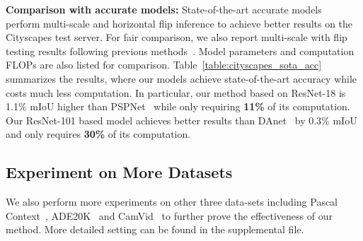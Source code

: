 \noindent
\textbf{Comparison with accurate models: } 
State-of-the-art accurate models~\cite{DAnet,pspnet,denseaspp,nvidia_seg_video} perform multi-scale and horizontal flip inference to achieve better results on the Cityscapes test server. For fair comparison, we also report multi-scale with flip testing results following previous methods~\cite{pspnet,DAnet}. Model parameters and computation FLOPs are also listed for comparison. Table~\ref{table:cityscapes_sota_acc} summarizes the results, where our models achieve state-of-the-art accuracy while costs much less computation. In particular, our method based on ResNet-18 is 1.1\% mIoU higher than PSPNet~\cite{pspnet} while only requiring \textbf{11\%} of its computation. Our ResNet-101 based model achieves better results than DAnet~\cite{DAnet} by 0.3\% mIoU and only requires \textbf{30\%} of its computation.


\subsection{Experiment on More Datasets}
 We also perform more experiments on other three data-sets including Pascal Context~\cite{pcontext-data}, ADE20K~\cite{ADE20K} and CamVid~\cite{CamVid} to further prove the effectiveness of our method. More detailed setting can be found in the supplemental file.

